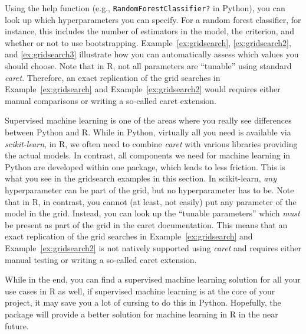 Using the help function (e.g., \texttt{RandomForestClassifier?} in Python),
you can look up
which hyperparameters you can specify. For a random forest classifier,
for instance, this includes the number of estimators in the model, the
criterion, and whether or not to use
bootstrapping. Example~\ref{ex:gridsearch}, \ref{ex:gridsearch2}, and
\ref{ex:gridsearch3} illustrate how you can automatically assess which
values you should choose.
Note that in R, not all parameters are ``tunable'' using standard \emph{caret}. Therefore, an exact replication of the grid searches in Example~\ref{ex:gridsearch} and Example~\ref{ex:gridsearch2} would requires either manual comparisons or writing a so-called caret extension.




\begin{feature}
    Supervised machine learning is one of the areas where you really
    see differences between Python and R. While in Python, virtually
    all you need is available via \emph{scikit-learn}, in R, we often
    need to combine \emph{caret} with various libraries providing the
    actual models. In contrast, all components we need for machine
    learning in Python are developed within one package, which leads
    to less friction. This is what you see in the gridsearch examples
    in this section. In scikit-learn, \emph{any} hyperparameter can be
    part of the grid, but no hyperparameter has to be. Note that in
    R, in contrast, you cannot (at least, not easily) put any
    parameter of the model in the grid. Instead, you can look up the
    ``tunable parameters'' which \emph{must} be present as part of the
    grid in the caret documentation. This means that an exact
    replication of the grid searches in Example~\ref{ex:gridsearch} and
    Example~\ref{ex:gridsearch2} is not natively supported using \emph{caret}
    and requires either manual testing or writing a so-called caret
    extension.

    While in the end, you can find a supervised machine learning
    solution for all your use cases in R as well, if supervised
    machine learning is at the core of your project, it may save you a
    lot of cursing to do this in Python.
    Hopefully, the  package will provide a better solution for machine learning in R
    in the near future.
\end{feature}

